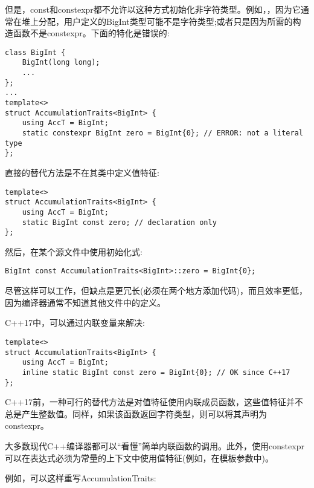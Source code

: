 但是，const和constexpr都不允许以这种方式初始化非字符类型。例如，，因为它通常在堆上分配，用户定义的BigInt类型可能不是字符类型;或者只是因为所需的构造函数不是constexpr。下面的特化是错误的:

\begin{lstlisting}[style=styleCXX]
class BigInt {
	BigInt(long long);
	...
};
...
template<>
struct AccumulationTraits<BigInt> {
	using AccT = BigInt;
	static constexpr BigInt zero = BigInt{0}; // ERROR: not a literal type
};
\end{lstlisting}

直接的替代方法是不在其类中定义值特征:

\begin{lstlisting}[style=styleCXX]
template<>
struct AccumulationTraits<BigInt> {
	using AccT = BigInt;
	static BigInt const zero; // declaration only
};
\end{lstlisting}

然后，在某个源文件中使用初始化式:

\begin{lstlisting}[style=styleCXX]
BigInt const AccumulationTraits<BigInt>::zero = BigInt{0};
\end{lstlisting}

尽管这样可以工作，但缺点是更冗长(必须在两个地方添加代码)，而且效率更低，因为编译器通常不知道其他文件中的定义。

C++17中，可以通过内联变量来解决:

\begin{lstlisting}[style=styleCXX]
template<>
struct AccumulationTraits<BigInt> {
	using AccT = BigInt;
	inline static BigInt const zero = BigInt{0}; // OK since C++17
};
\end{lstlisting}

C++17前，一种可行的替代方法是对值特征使用内联成员函数，这些值特征并不总是产生整数值。同样，如果该函数返回字符类型，则可以将其声明为constexpr。

\begin{tcolorbox}[colback=webgreen!5!white,colframe=webgreen!75!black]
\hspace*{0.75cm}大多数现代C++编译器都可以“看懂”简单内联函数的调用。此外，使用constexpr可以在表达式必须为常量的上下文中使用值特征(例如，在模板参数中)。
\end{tcolorbox}

例如，可以这样重写AccumulationTraits:

